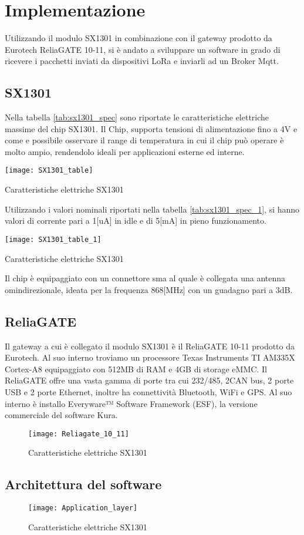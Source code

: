 \section{Implementazione}
Utilizzando il modulo SX1301 in combinazione con il gateway prodotto da Eurotech
ReliaGATE 10-11, si è andato a sviluppare un software in grado di ricevere i
pacchetti inviati da dispositivi LoRa e inviarli ad un Broker Mqtt.

\subsection{SX1301}
Nella tabella \ref{tab:sx1301_spec} sono riportate le caratteristiche elettriche
massime del  chip SX1301. Il Chip, supporta tensioni di
alimentazione fino a 4V e  come e possibile osservare il range di temperatura in cui il
chip può operare è molto ampio, rendendolo ideali per applicazioni esterne ed
interne. 

\begin{table}[h]
\centering 
\texttt{[image: SX1301\_table]}
\caption{Caratteristiche elettriche SX1301}
\label{tab:sx1301_spec}
\end{table}
Utilizzando i valori nominali riportati nella tabella \ref{tab:sx1301_spec_1},
si hanno valori di corrente pari a 1[uA] in idle  e di 5[mA] in pieno
funzionamento.
\begin{table}[h]
\centering 
\texttt{[image: SX1301\_table\_1]}
\caption{Caratteristiche elettriche SX1301}
\label{tab:sx1301_spec_1}
\end{table}
Il chip è equipaggiato con un connettore sma al quale è collegata una
antenna omindirezionale, ideata per la frequenza 868[MHz] con un guadagno pari a 3dB.
\subsection{ReliaGATE}
Il gateway a cui è collegato il modulo SX1301 è il ReliaGATE 10-11 prodotto da
Eurotech. Al suo interno troviamo un processore Texas Instruments TI AM335X Cortex-A8 
equipaggiato con 512MB di RAM e 4GB di storage eMMC. Il ReliaGATE offre una
vasta gamma di porte tra cui 232/485, 2CAN bus, 2 porte USB e 2 porte Ethernet,
inoltre ha connettività Bluetooth, WiFi e GPS. Al suo interno è installo
Everyware™ Software Framework (ESF), la versione commerciale del software Kura.
\begin{figure}[h]
\centering 
\texttt{[image: Reliagate\_10\_11]}
\caption{Caratteristiche elettriche SX1301}
\label{fig:ReliaGATE}
\end{figure}


\subsection{Architettura del software}
\begin{figure}[h]
\centering 
\texttt{[image: Application\_layer]}
\caption{Caratteristiche elettriche SX1301}
\label{fig:ReliaGATE}
\end{figure}

